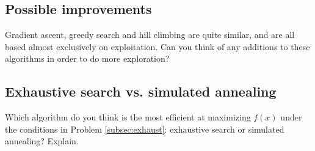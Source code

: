 \documentclass{article}           %
\newcommand\marginsymbol[1][0pt]{%
  \tabto*{0cm}\makebox[\dimexpr-1cm-#1\relax][r]{$\mathbb{P}$}\tabto*{\TabPrevPos}}
\begin{document}
\subsection{Possible improvements}
Gradient ascent, greedy search and hill climbing are quite similar, and are
all based almost exclusively on exploitation. Can you think of any additions
to these algorithms in order to do more exploration?

\subsection{Exhaustive search vs. simulated annealing}
Which algorithm do you think is the most efficient at maximizing \(f(x)\) under
the conditions in Problem \ref{subsec:exhaust}: exhaustive search or simulated annealing?
Explain.
\begin{comment}
\section{Evolutionary strategies(ES) theory}
\subsection{Comparing strategies}
A common variant of evolutionary strategies used for (local) search is the
(1 + 4) ES. How would this differ from the (1 + 1) ES in how the search space
is explored? How does this, and (1 + \(\lambda\)) in general, compare to hill
climbing and greedy search?
\subsection{Performance}
What effect does an adaptive search strategy have on optimization performance?
\subsection{Mutation time}
How would it affect the search if the strategy parameters were mutated after
the solution parameters instead of before?

\section{ES implementation and comparison}
\subsection{3 generation result \marginsymbol}
Ignoring mutation, and starting with the population \{1, 2, 3, 4\}, implement
and run 3 generations of a (4 + 8) ES maximizing \(g(x) = x\), and observe
what the end population looks like (use intermediary recombination).

\end{comment}
\end{document}
